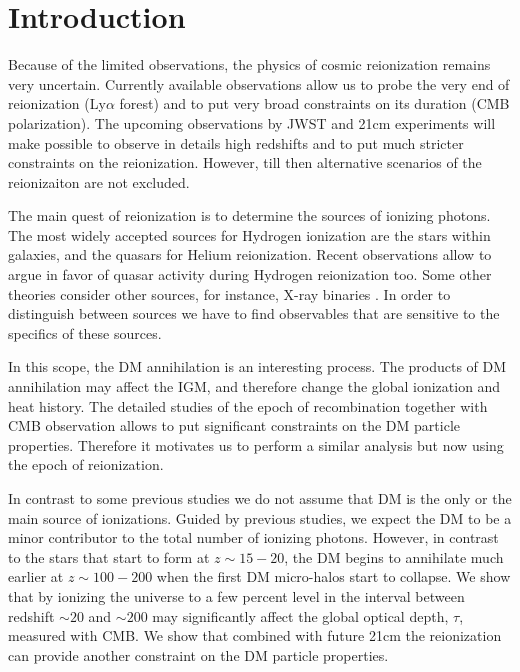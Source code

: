 \section{Introduction}

Because of the limited observations, the physics of cosmic reionization remains very uncertain. Currently available observations allow us to probe the very end of reionization (Ly$\alpha$ forest) and to put very broad constraints on its duration (CMB polarization). The upcoming observations by JWST and 21cm experiments will make possible to observe in details high redshifts and to put much stricter constraints on the reionization. However, till then alternative scenarios of the reionizaiton are not excluded.

The main quest of reionization is to determine the sources of ionizing photons. The most widely accepted sources for Hydrogen ionization are the stars within galaxies, and the quasars for Helium reionization. Recent observations allow \cite{2015arXiv150707678M} to argue in favor of quasar activity during Hydrogen reionization too. Some other theories consider other sources, for instance, X-ray binaries \cite{Fialkov_2014}. In order to distinguish between sources we have to find observables that are sensitive to the specifics of these sources.

In this scope, the DM annihilation is an interesting process. The products of DM annihilation may affect the IGM, and therefore change the global ionization and heat history. The detailed studies of the epoch of recombination together with CMB observation allows \citet{2015arXiv150603811S} to put significant constraints on the DM particle properties. Therefore it motivates us to perform a similar analysis but now using the epoch of reionization. 

In contrast to some previous studies \cite{2009JCAP...10..009C, 2009PhRvD..80c5007B} we do not assume that DM is the only or the main source of ionizations. Guided by previous studies, we expect the DM to be a minor contributor to the total number of ionizing photons. However, in contrast to the stars that start to form at $z\sim 15-20$, the DM begins to annihilate much earlier at $z\sim100-200$ when the first DM micro-halos start to collapse. We show that by ionizing the universe to a few percent level in the interval between redshift $\sim20$ and $\sim200$ may significantly affect the global optical depth, $\tau$, measured with CMB. We show that combined with future 21cm the reionization can provide another constraint on the DM particle properties.

